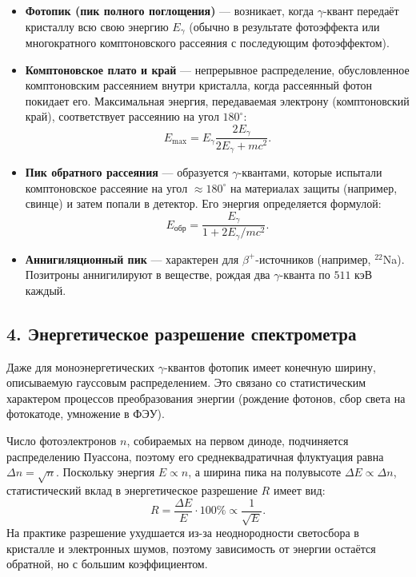 \documentclass[12pt,a4paper]{article}
\begin{document}
\begin{itemize}
    \item \textbf{Фотопик (пик полного поглощения)} --- возникает, когда $\gamma$-квант передаёт кристаллу всю свою энергию $E_\gamma$ (обычно в результате фотоэффекта или многократного комптоновского рассеяния с последующим фотоэффектом).
    \item \textbf{Комптоновское плато и край} --- непрерывное распределение, обусловленное комптоновским рассеянием внутри кристалла, когда рассеянный фотон покидает его. Максимальная энергия, передаваемая электрону (комптоновский край), соответствует рассеянию на угол $180^\circ$:
    \begin{equation}
        E_{\text{max}} = E_\gamma \frac{2E_\gamma}{2E_\gamma + mc^2}.
    \end{equation}
    \item \textbf{Пик обратного рассеяния} --- образуется $\gamma$-квантами, которые испытали комптоновское рассеяние на угол $\approx 180^\circ$ на материалах защиты (например, свинце) и затем попали в детектор. Его энергия определяется формулой:
    \begin{equation}
        E_{\text{обр}} = \frac{E_\gamma}{1 + 2E_\gamma / mc^2}.
    \end{equation}
    \item \textbf{Аннигиляционный пик} --- характерен для $\beta^+$-источников (например, $^{22}$Na). Позитроны аннигилируют в веществе, рождая два $\gamma$-кванта по $511$ кэВ каждый.
\end{itemize}

\subsection*{4. Энергетическое разрешение спектрометра}
Даже для моноэнергетических $\gamma$-квантов фотопик имеет конечную ширину, описываемую гауссовым распределением. Это связано со статистическим характером процессов преобразования энергии (рождение фотонов, сбор света на фотокатоде, умножение в ФЭУ). 

Число фотоэлектронов $n$, собираемых на первом диноде, подчиняется распределению Пуассона, поэтому его среднеквадратичная флуктуация равна $\Delta n = \sqrt{n}$. Поскольку энергия $E \propto n$, а ширина пика на полувысоте $\Delta E \propto \Delta n$, статистический вклад в энергетическое разрешение $R$ имеет вид:
\begin{equation}
    R = \frac{\Delta E}{E} \cdot 100\% \propto \frac{1}{\sqrt{E}}.
\end{equation}
На практике разрешение ухудшается из-за неоднородности светосбора в кристалле и электронных шумов, поэтому зависимость от энергии остаётся обратной, но с большим коэффициентом.
\end{document}
